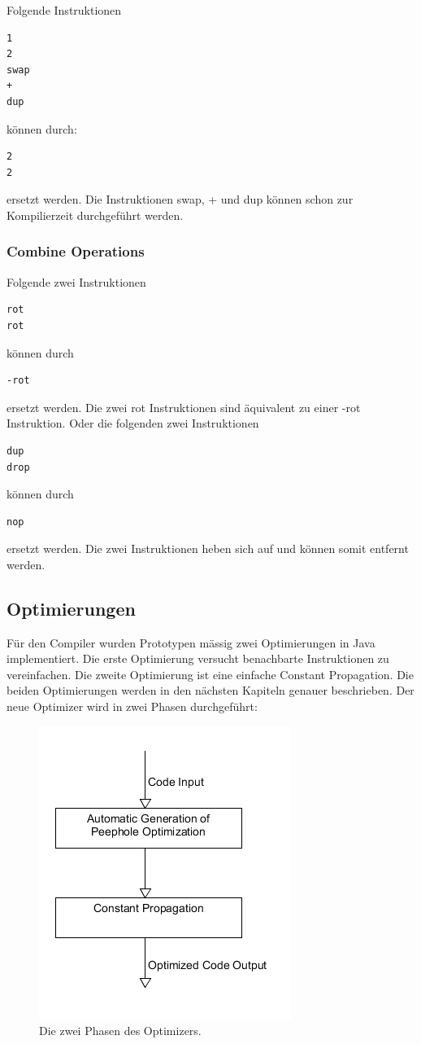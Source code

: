 Folgende Instruktionen
%
\begin{verbatim}
1
2
swap
+
dup
\end{verbatim}
%
können durch:
%
\begin{verbatim}
2
2
\end{verbatim}
%
ersetzt werden. Die Instruktionen swap, + und dup können schon zur Kompilierzeit durchgeführt werden.
\subsubsection{Combine Operations}
Folgende zwei Instruktionen
%
\begin{verbatim}
rot
rot
\end{verbatim}
%
können durch
%
\begin{verbatim}
-rot
\end{verbatim}
%
ersetzt werden. Die zwei rot Instruktionen sind äquivalent zu einer -rot Instruktion. Oder die folgenden zwei Instruktionen
%
\begin{verbatim}
dup
drop
\end{verbatim}
%
können durch
%
\begin{verbatim}
nop
\end{verbatim}
%
ersetzt werden. Die zwei Instruktionen heben sich auf und können somit entfernt werden.

\newpage

\subsection{Optimierungen}

Für den Compiler wurden Prototypen mässig zwei Optimierungen in Java implementiert. Die erste Optimierung versucht benachbarte Instruktionen zu vereinfachen. Die zweite Optimierung ist eine einfache Constant Propagation. Die beiden Optimierungen werden in den nächsten Kapiteln genauer beschrieben. Der neue Optimizer wird in zwei Phasen durchgeführt:

\begin{figure}[H]
	\centering
		\includegraphics[scale=0.6]{optimizer/optimizer.png}
		\caption{Die zwei Phasen des Optimizers.}
		\label{fig:optimizer}
\end{figure}

